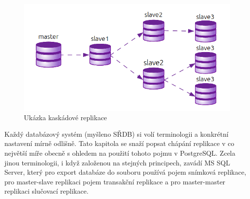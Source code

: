           \begin{figure}[H]
            \centering
            \includegraphics[scale=1]{../../../grafy/obr/schema_kaskadova.png}
            \caption{Ukázka kaskádové replikace}
            \label{kaskadova}
          \end{figure}

Každý  databázový systém (myšleno SŘDB) si volí terminologii a konkrétní nastavení mírně odlišně. Tato kapitola se snaží popsat chápání replikace v co největší míře obecně s ohledem na použití tohoto pojmu v PostgreSQL. Zcela jinou terminologii, i když založenou na stejných principech, zavádí MS SQL Server, který pro export databáze do souboru používá pojem snímková replikace, pro master-slave replikaci pojem transakční replikace a pro master-master replikaci slučovací replikace. 




